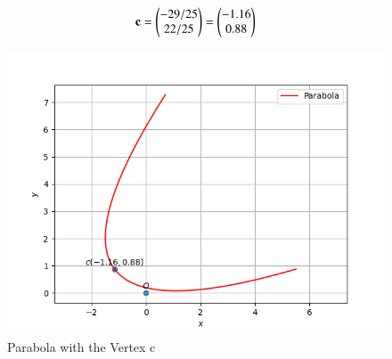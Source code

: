 \documentclass[journal,12pt,twocolumn]{IEEEtran}
\begin{document}
\begin{align}
\mathbf{c}=\begin{pmatrix} -29/25\\22/25\end{pmatrix}= \begin{pmatrix}-1.16\\ 0.88\end{pmatrix} 
\end{align}
\begin{figure}[!ht]
    \centering
    \includegraphics[width=\columnwidth]{Figure_1.png}
    \caption{Parabola with the Vertex c}
\end{figure}
\end{document}
